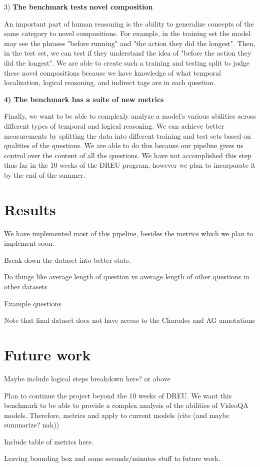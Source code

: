 \documentclass[10pt,twocolumn,letterpaper]{article}
\newcommand{\mgm}[1]{{\color{cyan}{mgm: #1}}}
\begin{document}
    
    
    3) \textbf{The benchmark tests novel composition}
    
    An important part of human reasoning is the ability to generalize concepts of the same category to novel compositions. For example, in the training set the model may see the phrases "before running" and "the action they did the longest". Then, in the test set, we can test if they understand the idea of "before the action they did the longest". We are able to create such a training and testing split to judge these novel compositions because we have knowledge of what temporal localization, logical reasoning, and indirect tags are in each question. \mgm{Potentially VG slide 18 for how to solve them?}
    


    
    \textbf{4) The benchmark has a suite of new metrics}
    
    Finally, we want to be able to complexly analyze a model's various abilities across different types of temporal and logical reasoning. We can achieve better measurements by splitting the data into different training and test sets based on qualities of the questions. We are able to do this because our pipeline gives us control over the content of all the questions. We have not accomplished this step thus far in the 10 weeks of the DREU program, however we plan to incorporate it by the end of the summer. 

\section{Results}

We have implemented most of this pipeline, besides the metrics which we plan to implement soon. 

Break down the dataset into better stats. 

Do things like average length of question vs average length of other questions in other datasets

Example questions

Note that final dataset does not have access to the Charades and AG annotations



\section{Future work}

Maybe include logical steps breakdown here? or above

Plan to continue the project beyond the 10 weeks of DREU. We want this benchmark to be able to provide a complex analysis of the abilities of VideoQA models. Therefore, metrics and apply to current models (cite (and maybe summarize? nah))

Include table of metrics here. 

Leaving bounding box and some seconds/minutes stuff to future work. 


{\small


}
\end{document}
